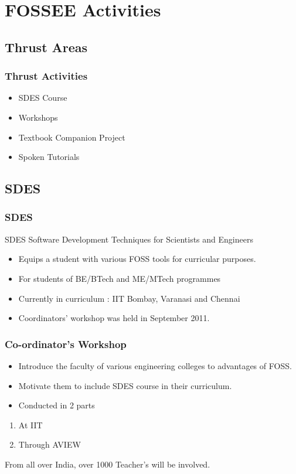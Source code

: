 \documentclass[compress,red]{beamer} %
\begin{document}
\section{FOSSEE Activities}

\subsection{Thrust Areas}
\begin{frame}
\frametitle{Thrust Activities}
\begin{itemize}
\item SDES Course \pause
\item Workshops  \pause
\item Textbook Companion Project  \pause
\item Spoken Tutorials \pause
\end{itemize}
\end{frame}

\subsection{SDES}
\begin{frame}
\frametitle{SDES}
\begin{block}{SDES}
Software Development Techniques for Scientists and Engineers
\end{block}
\begin{itemize}
\item Equips a student with various FOSS tools for curricular purposes.
\item For students of BE/BTech and ME/MTech programmes
\item Currently in curriculum : IIT Bombay, Varanasi and Chennai
\item Coordinators' workshop was held in September 2011.
\end{itemize}
\end{frame}

\begin{frame}
\frametitle{Co-ordinator's Workshop}
\begin{itemize}
\item Introduce the faculty of various engineering colleges to advantages of FOSS. \pause
\item Motivate them to include SDES course in their curriculum. \pause
\item Conducted in 2 parts \pause
\end{itemize}
\begin{enumerate}
\item At IIT
\item Through AVIEW \pause
\end{enumerate}
\begin{block}
From all over India, over \alert{1000} Teacher's will be involved.
\end{block}
\end{frame}
\end{document}
